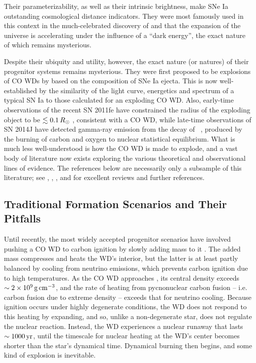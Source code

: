 Their parameterizability, as well as their intrinsic brightness, make SNe Ia outstanding cosmological distance indicators.  They were most famously used in this context in the much-celebrated discovery of \citep{ries+98} and \cite{perl+99} that the expansion of the universe is accelerating under the influence of a ``dark energy'', the exact nature of which remains mysterious.

Despite their ubiquity and utility, however, the exact nature (or natures) of their progenitor systems remains mysterious.  They were first proposed to be explosions of CO WDs by \cite{hoylf60} based on the composition of SNe Ia ejecta.  This is now well-established by the similarity of the light curve, energetics and spectrum of a typical SN Ia to those calculated for an exploding CO WD.  Also, early-time observations of the recent SN 2011fe have constrained the radius of the exploding object to be $\lesssim0.1\,\Rsun$ \citep{nuge+11, bloo+12}, consistent with a CO WD, while late-time observations of SN 2014J have detected gamma-ray emission from the decay of \Ni\ \citep{chur+14}, produced by the burning of carbon and oxygen to nuclear statistical equilibrium.  What is much less well-understood is how the CO WD is made to explode, and a vast body of literature now exists exploring the various theoretical and observational lines of evidence.  The references below are necessarily only a subsample of this literature; see \cite{howe11}, \cite{hill+13}, \cite{maozmn14}, and \cite{tsebs15} for excellent reviews and further references.

\subsection{Traditional Formation Scenarios and Their Pitfalls}
\label{ssec:c1_old_typeia}

Until recently, the most widely accepted progenitor scenarios have involved pushing a CO WD to carbon ignition by slowly adding mass to it \citep{hilln00}.  The added mass compresses and heats the WD's interior, but the latter is at least partly balanced by cooling from neutrino emissions, which prevents carbon ignition due to high temperatures.  As the CO WD approaches \Mch, its central density exceeds $\sim2\times10^9\,\gcc$, and the rate of heating from pycnonuclear carbon fusion -- i.e. carbon fusion due to extreme density -- exceeds that for neutrino cooling.  Because ignition occurs under highly degenerate conditions, the WD does not respond to this heating by expanding, and so, unlike a non-degenerate star, does not regulate the nuclear reaction.  Instead, the WD experiences a nuclear runaway that lasts $\sim1000\,\mathrm{yr}$, until the timescale for nuclear heating at the WD's center becomes shorter than the star's dynamical time.  Dynamical burning then begins, and some kind of explosion is inevitable.

